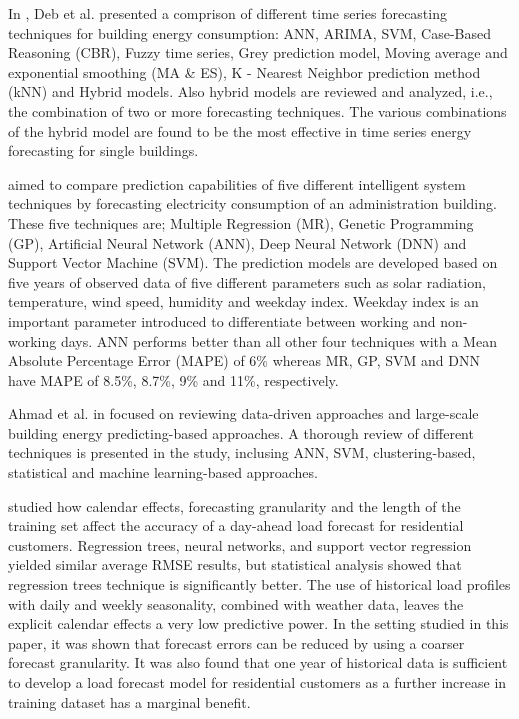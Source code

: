In \cite{DEB2017902}, Deb et al. presented a comprison of different time series forecasting techniques for building energy consumption: ANN, ARIMA, SVM, Case-Based Reasoning (CBR), Fuzzy time series, Grey prediction model, Moving average and exponential smoothing (MA \& ES), K - Nearest Neighbor prediction method (kNN) and Hybrid models.
Also hybrid models are reviewed and analyzed, i.e., the combination of two or more forecasting techniques.
The various combinations of the hybrid model are found to be the most effective in time series energy forecasting for single buildings.

\cite{AMBER2018886} aimed to compare prediction capabilities of five different intelligent system techniques by forecasting electricity consumption of an administration building.
These five techniques are; Multiple Regression (MR), Genetic Programming (GP), Artificial Neural Network (ANN), Deep Neural Network (DNN) and Support Vector Machine (SVM). 
The prediction models are developed based on five years of observed data of five different parameters such as solar radiation, temperature, wind speed, humidity and weekday index.
Weekday index is an important parameter introduced to differentiate between working and non-working days.
ANN performs better than all other four techniques with a Mean Absolute Percentage Error (MAPE) of 6\% whereas MR, GP, SVM and DNN have MAPE of 8.5\%, 8.7\%, 9\% and 11\%, respectively.

Ahmad et al. in \cite{AHMAD2018301} focused on reviewing data-driven approaches and large-scale building energy predicting-based approaches.
A thorough review of different techniques is presented in the study, inclusing ANN, SVM, clustering-based, statistical and machine learning-based approaches.

\cite{LUSIS2017654} studied how calendar effects, forecasting granularity and the length of the training set affect the accuracy of a day-ahead load forecast for residential customers.
Regression trees, neural networks, and support vector regression yielded similar average RMSE results, but statistical analysis showed that regression trees technique is significantly better.
The use of historical load profiles with daily and weekly seasonality, combined with weather data, leaves the explicit calendar effects a very low predictive power.
In the setting studied in this paper, it was shown that forecast errors can be reduced by using a coarser forecast granularity.
It was also found that one year of historical data is sufficient to develop a load forecast model for residential customers as a further increase in training dataset has a marginal benefit.

